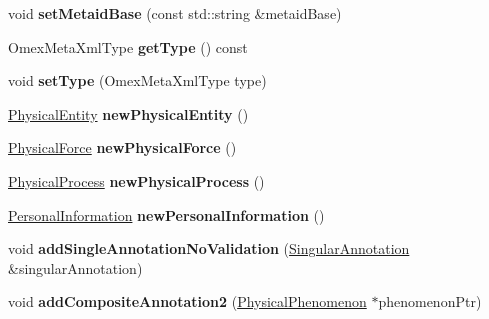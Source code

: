 \begin{DoxyCompactItemize}
\mbox{\label{classomexmeta_1_1Editor_a206feee18473abbeda5e4e55906e73eb}} 
void {\bfseries set\+Metaid\+Base} (const std\+::string \&metaid\+Base)
\item 
\mbox{\label{classomexmeta_1_1Editor_a68ade6a293061a98243a3b2853e55a4b}} 
Omex\+Meta\+Xml\+Type {\bfseries get\+Type} () const
\item 
\mbox{\label{classomexmeta_1_1Editor_a3e2c493ed5034a15e6915b7b649b58a3}} 
void {\bfseries set\+Type} (Omex\+Meta\+Xml\+Type type)
\item 
\mbox{\label{classomexmeta_1_1Editor_a245b2105c175892d1fddaf693fa9d636}} 
\hyperlink{classomexmeta_1_1PhysicalEntity}{Physical\+Entity} {\bfseries new\+Physical\+Entity} ()
\item 
\mbox{\label{classomexmeta_1_1Editor_a58d21ef09f3dc5a6a66dbafe34150695}} 
\hyperlink{classomexmeta_1_1PhysicalForce}{Physical\+Force} {\bfseries new\+Physical\+Force} ()
\item 
\mbox{\label{classomexmeta_1_1Editor_a2815d918736ee17d07306c5cf07c8ebf}} 
\hyperlink{classomexmeta_1_1PhysicalProcess}{Physical\+Process} {\bfseries new\+Physical\+Process} ()
\item 
\mbox{\label{classomexmeta_1_1Editor_a1943079ddbc4a4c6d896f51f360a11df}} 
\hyperlink{classomexmeta_1_1PersonalInformation}{Personal\+Information} {\bfseries new\+Personal\+Information} ()
\item 
\mbox{\label{classomexmeta_1_1Editor_a8fb3a19e8f64aeff2ac9b78c483843de}} 
void {\bfseries add\+Single\+Annotation\+No\+Validation} (\hyperlink{classomexmeta_1_1Triple}{Singular\+Annotation} \&singular\+Annotation)
\item 
\mbox{\label{classomexmeta_1_1Editor_ad05d04a31263f9c7cb8105e29fd9d158}} 
void {\bfseries add\+Composite\+Annotation2} (\hyperlink{classomexmeta_1_1PhysicalPhenomenon}{Physical\+Phenomenon} $\ast$phenomenon\+Ptr)
\item 
\mbox{\label{classomexmeta_1_1Editor_ace8ee873498fa72b63c0747775b729f5}} 

\end{DoxyCompactItemize}
